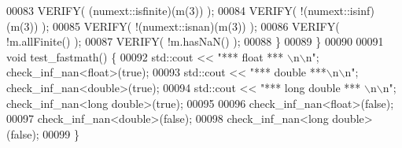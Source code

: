 \begin{DoxyCode}
00083     VERIFY(  (numext::isfinite)(m(3)) );
00084     VERIFY( !(numext::isinf)(m(3)) );
00085     VERIFY( !(numext::isnan)(m(3)) );
00086     VERIFY( !m.allFinite() );
00087     VERIFY( !m.hasNaN() );
00088   \}
00089 \}
00090 
00091 \textcolor{keywordtype}{void} test\_fastmath() \{
00092   std::cout << \textcolor{stringliteral}{"*** float *** \(\backslash\)n\(\backslash\)n"}; check\_inf\_nan<float>(\textcolor{keyword}{true});
00093   std::cout << \textcolor{stringliteral}{"*** double ***\(\backslash\)n\(\backslash\)n"}; check\_inf\_nan<double>(\textcolor{keyword}{true});
00094   std::cout << \textcolor{stringliteral}{"*** long double *** \(\backslash\)n\(\backslash\)n"}; check\_inf\_nan<long double>(\textcolor{keyword}{true});
00095 
00096   check\_inf\_nan<float>(\textcolor{keyword}{false});
00097   check\_inf\_nan<double>(\textcolor{keyword}{false});
00098   check\_inf\_nan<long double>(\textcolor{keyword}{false});
00099 \}
\end{DoxyCode}
